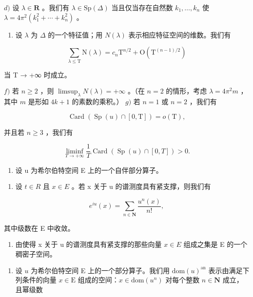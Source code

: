 \(d)\) 设 \(\lambda\in\mathbf{R}\) 。我们有 \(\lambda\in\mathrm{Sp}(\Delta)\) 当且仅当存在自然数 \(k_{1},\ldots,k_{n}\) 使 \(\lambda=4\pi^{2}(k_{1}^{2}+\cdots+k_{n}^{2})\) 。

\begin{enumerate}
\def\labelenumi{\alph{enumi})}
\setcounter{enumi}{4}
\tightlist
\item
  设 \(\lambda\) 为 \(\Delta\) 的一个特征值；用 \(N(\lambda)\) 表示相应特征空间的维数。我们有
\end{enumerate}

\[
\sum_ {\lambda \leqslant \mathrm{T}} \mathrm{N} (\lambda) = c _ {n} \mathrm{T} ^ {n / 2} + \mathrm{O} (\mathrm{T} ^ {(n - 1) / 2})
\]

当 T → +∞ 时成立。

\(f)\) 若 \(n \geqslant 2\) ，则 \(\limsup_{\lambda} N(\lambda) = +\infty\) 。（在 \(n = 2\) 的情形，考虑 \(\lambda = 4\pi^2 m\) ，其中 \(m\) 是形如 \(4k + 1\) 的素数的乘积。） \(g)\) 若 \(n = 1\) 或 \(n = 2\) ，我们有

\[
\operatorname{Card} (\operatorname{Sp} (u) \cap [ 0, \mathrm{T} ]) = o (\mathrm{T}),
\]

并且若 \(n\geqslant 3\) ，我们有

\[
\liminf _ {T \to + \infty} \frac {1}{T} \operatorname{Card} (\operatorname{Sp} (u) \cap [ 0, T ]) > 0.
\]

\begin{enumerate}
\def\labelenumi{\arabic{enumi})}
\setcounter{enumi}{18}
\tightlist
\item
  设 u 为希尔伯特空间 E 上的一个自伴部分算子。
\end{enumerate}

\begin{enumerate}
\def\labelenumi{\alph{enumi})}
\tightlist
\item
  设 \(t \in R\) 且 \(x \in E\) 。若 x 关于 u 的谱测度具有紧支撑，则我们有
\end{enumerate}

\[
e ^ {i u} (x) = \sum_ {n \in \mathbf {N}} \frac {u ^ {n} (x)}{n !},
\]

其中级数在 E 中收敛。

\begin{enumerate}
\def\labelenumi{\alph{enumi})}
\setcounter{enumi}{1}
\tightlist
\item
  由使得 x 关于 u 的谱测度具有紧支撑的那些向量 \(x \in E\) 组成之集是 E 的一个稠密子空间。
\end{enumerate}

\begin{enumerate}
\def\labelenumi{\arabic{enumi})}
\setcounter{enumi}{19}
\tightlist
\item
  设 \(u\) 为希尔伯特空间 E 上的一个部分算子。我们用 \(\mathrm{dom}(u)^{\mathrm{an}}\) 表示由满足下列条件的向量 \(x \in \mathrm{E}\) 组成的空间：\(x \in \mathrm{dom}(u^n)\) 对每个整数 \(n \in \mathbf{N}\) 成立，且幂级数
\end{enumerate}

